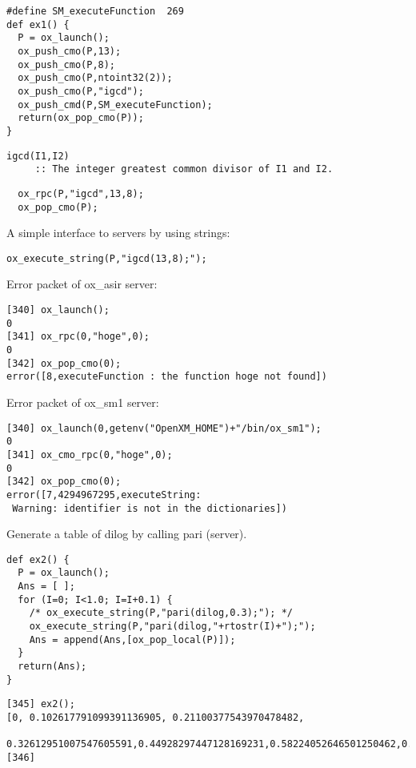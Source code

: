 \documentclass{slides}
\begin{document}


\begin{verbatim}
#define SM_executeFunction  269
def ex1() {
  P = ox_launch();
  ox_push_cmo(P,13);
  ox_push_cmo(P,8);
  ox_push_cmo(P,ntoint32(2));
  ox_push_cmo(P,"igcd");
  ox_push_cmd(P,SM_executeFunction);
  return(ox_pop_cmo(P));
}
\end{verbatim}
{\footnotesize
\begin{verbatim}
igcd(I1,I2)
     :: The integer greatest common divisor of I1 and I2.
\end{verbatim}
}

\begin{verbatim}
  ox_rpc(P,"igcd",13,8);
  ox_pop_cmo(P);
\end{verbatim}

A simple interface to servers by using strings:
\begin{verbatim}
ox_execute_string(P,"igcd(13,8);");
\end{verbatim}
\newpage

Error packet of ox\_asir server:
\begin{verbatim}
[340] ox_launch();
0
[341] ox_rpc(0,"hoge",0);
0
[342] ox_pop_cmo(0);
error([8,executeFunction : the function hoge not found])
\end{verbatim}

Error packet of ox\_sm1 server:
\begin{verbatim}
[340] ox_launch(0,getenv("OpenXM_HOME")+"/bin/ox_sm1");
0
[341] ox_cmo_rpc(0,"hoge",0);
0
[342] ox_pop_cmo(0);
error([7,4294967295,executeString: 
 Warning: identifier is not in the dictionaries])
\end{verbatim}

\newpage
Generate a table of dilog by calling pari (server).
\begin{verbatim}
def ex2() {
  P = ox_launch();
  Ans = [ ];
  for (I=0; I<1.0; I=I+0.1) {
    /* ox_execute_string(P,"pari(dilog,0.3);"); */
    ox_execute_string(P,"pari(dilog,"+rtostr(I)+");");
    Ans = append(Ans,[ox_pop_local(P)]);
  }
  return(Ans);
}
\end{verbatim}
\begin{verbatim}
[345] ex2();
[0, 0.102617791099391136905, 0.21100377543970478482,
 0.32612951007547605591,0.44928297447128169231,0.58224052646501250462,0.72758630771633335369,0.88937762428603865937,1.074794600008248448403,1.29971472300495878170,1.64493406684822643609]
[346] 
\end{verbatim}
\newpage
\end{document}
